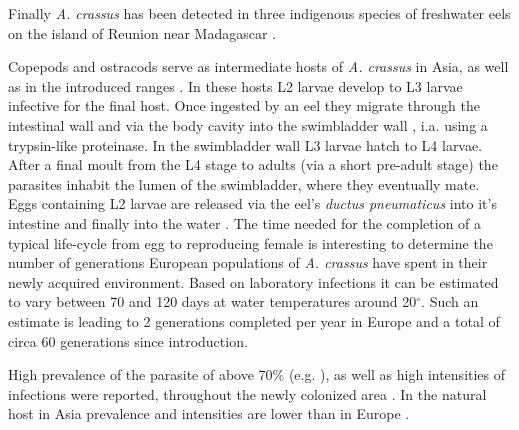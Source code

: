 Finally \textit{A. crassus} has been detected in three indigenous
species of freshwater eels on the island of Reunion near Madagascar
\cite{sasal_parasite_2008}.

Copepods and ostracods serve as intermediate hosts of
\textit{A. crassus} in Asia, as well as in the introduced ranges
\cite{moravec_first_2005}. In these hosts L2 larvae develop to L3
larvae infective for the final host. Once ingested by an eel they
migrate through the intestinal wall and via the body cavity into the
swimbladder wall \cite{haenen_effects_1996}, i.a. using a trypsin-like
proteinase\cite{polzer_identification_1993}. In the swimbladder wall
L3 larvae hatch to L4 larvae. After a final moult from the L4 stage to
adults (via a short pre-adult stage) the parasites inhabit the lumen of
the swimbladder, where they eventually mate. Eggs containing L2 larvae
are released via the eel's \textit{ductus pneumaticus} into it's
intestine and finally into the water
\cite{de_charleroy_life_1990}. The time needed for the completion of a
typical life-cycle from egg to reproducing female is interesting to
determine the number of generations European populations of
\textit{A. crassus} have spent in their newly acquired
environment. Based on laboratory infections it can be estimated to vary
between 70 and 120 days at water temperatures around 20$^{\circ}$.
Such an estimate is leading to 2 generations completed per year in
Europe and a total of circa 60 generations since introduction.



High prevalence of the parasite of above 70\%
(e.g. \cite{wrtz_distribution_1998,thomas1992population}), as well as
high intensities of infections were reported, throughout the newly
colonized area \cite{lefebvre_anguillicolosis:_2004}. In the natural
host in Asia prevalence and intensities are lower than in Europe
\cite{mnderle_occurrence_2006}.

